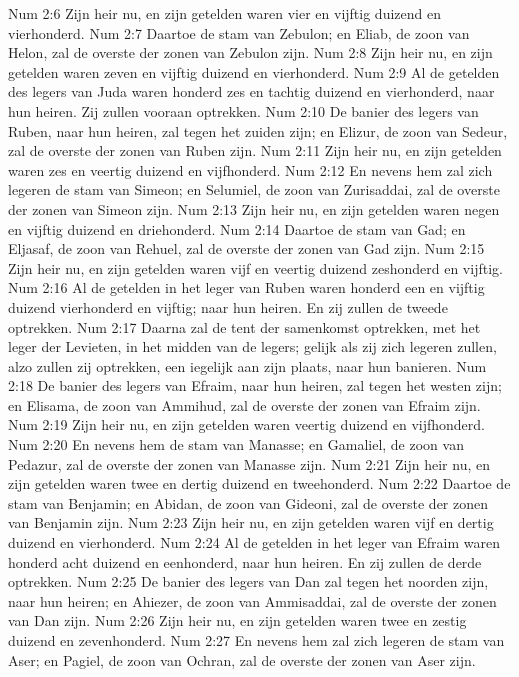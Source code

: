 Num 2:6  Zijn heir nu, en zijn getelden waren vier en vijftig duizend en vierhonderd.
Num 2:7  Daartoe de stam van Zebulon; en Eliab, de zoon van Helon, zal de overste der zonen van Zebulon zijn.
Num 2:8  Zijn heir nu, en zijn getelden waren zeven en vijftig duizend en vierhonderd.
Num 2:9  Al de getelden des legers van Juda waren honderd zes en tachtig duizend en vierhonderd, naar hun heiren. Zij zullen vooraan optrekken.
Num 2:10  De banier des legers van Ruben, naar hun heiren, zal tegen het zuiden zijn; en Elizur, de zoon van Sedeur, zal de overste der zonen van Ruben zijn.
Num 2:11  Zijn heir nu, en zijn getelden waren zes en veertig duizend en vijfhonderd.
Num 2:12  En nevens hem zal zich legeren de stam van Simeon; en Selumiel, de zoon van Zurisaddai, zal de overste der zonen van Simeon zijn.
Num 2:13  Zijn heir nu, en zijn getelden waren negen en vijftig duizend en driehonderd.
Num 2:14  Daartoe de stam van Gad; en Eljasaf, de zoon van Rehuel, zal de overste der zonen van Gad zijn.
Num 2:15  Zijn heir nu, en zijn getelden waren vijf en veertig duizend zeshonderd en vijftig.
Num 2:16  Al de getelden in het leger van Ruben waren honderd een en vijftig duizend vierhonderd en vijftig; naar hun heiren. En zij zullen de tweede optrekken.
Num 2:17  Daarna zal de tent der samenkomst optrekken, met het leger der Levieten, in het midden van de legers; gelijk als zij zich legeren zullen, alzo zullen zij optrekken, een iegelijk aan zijn plaats, naar hun banieren.
Num 2:18  De banier des legers van Efraim, naar hun heiren, zal tegen het westen zijn; en Elisama, de zoon van Ammihud, zal de overste der zonen van Efraim zijn.
Num 2:19  Zijn heir nu, en zijn getelden waren veertig duizend en vijfhonderd.
Num 2:20  En nevens hem de stam van Manasse; en Gamaliel, de zoon van Pedazur, zal de overste der zonen van Manasse zijn.
Num 2:21  Zijn heir nu, en zijn getelden waren twee en dertig duizend en tweehonderd.
Num 2:22  Daartoe de stam van Benjamin; en Abidan, de zoon van Gideoni, zal de overste der zonen van Benjamin zijn.
Num 2:23  Zijn heir nu, en zijn getelden waren vijf en dertig duizend en vierhonderd.
Num 2:24  Al de getelden in het leger van Efraim waren honderd acht duizend en eenhonderd, naar hun heiren. En zij zullen de derde optrekken.
Num 2:25  De banier des legers van Dan zal tegen het noorden zijn, naar hun heiren; en Ahiezer, de zoon van Ammisaddai, zal de overste der zonen van Dan zijn.
Num 2:26  Zijn heir nu, en zijn getelden waren twee en zestig duizend en zevenhonderd.
Num 2:27  En nevens hem zal zich legeren de stam van Aser; en Pagiel, de zoon van Ochran, zal de overste der zonen van Aser zijn.

